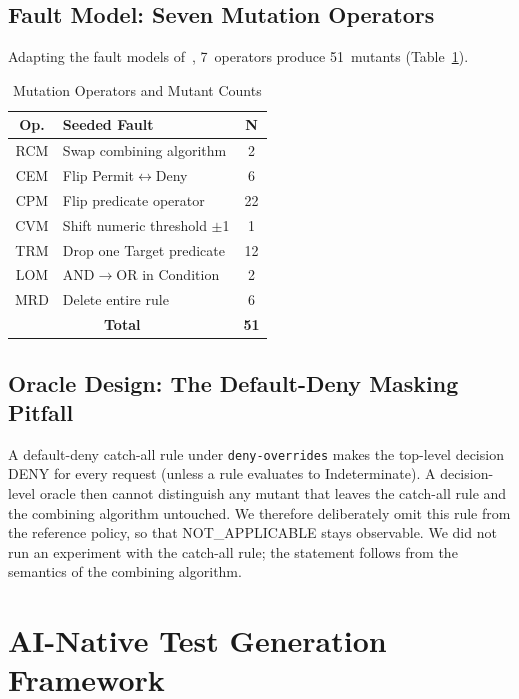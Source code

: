 \documentclass[conference]{IEEEtran}
\begin{document}
\subsection{Fault Model: Seven Mutation Operators}

Adapting the fault models of~\cite{b1,b2,b3}, 7~operators produce 51~mutants
(Table~\ref{tab:mutants}).

\begin{table}[htbp]
\caption{Mutation Operators and Mutant Counts}
\label{tab:mutants}
\begin{center}
\begin{tabular}{|c|p{4.0cm}|c|}
\hline
\textbf{Op.} & \textbf{Seeded Fault} & \textbf{N} \\
\hline
RCM & Swap combining algorithm & 2 \\
\hline
CEM & Flip Permit$\leftrightarrow$Deny & 6 \\
\hline
CPM & Flip predicate operator & 22 \\
\hline
CVM & Shift numeric threshold $\pm$1 & 1 \\
\hline
TRM & Drop one Target predicate & 12 \\
\hline
LOM & AND$\to$OR in Condition & 2 \\
\hline
MRD & Delete entire rule & 6 \\
\hline
\multicolumn{2}{|c|}{\textbf{Total}} & \textbf{51} \\
\hline
\end{tabular}
\end{center}
\end{table}

\subsection{Oracle Design: The Default-Deny Masking Pitfall}

A default-deny catch-all rule under \texttt{deny-overrides} makes the
top-level decision DENY for every request (unless a rule evaluates to
Indeterminate). A decision-level oracle then cannot distinguish any mutant that
leaves the catch-all rule and the combining algorithm untouched. We therefore
deliberately omit this rule from the reference policy, so that NOT\_APPLICABLE
stays observable. We did not run an experiment with the catch-all rule; the
statement follows from the semantics of the combining algorithm.

\section{AI-Native Test Generation Framework}
\end{document}
